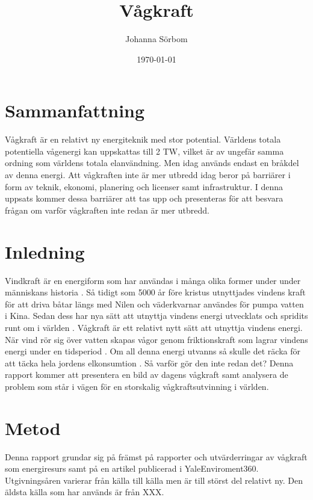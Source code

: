 \documentclass[10pt,a4paper,oneside]{article}
\newcommand{\titlepicture}[2][]{%
  \renewcommand\placetitlepicture{%
    \texttt{[image: \#2]}\par\medskip
  }%
}
\newcommand{\placetitlepicture}{}
\begin{document}
\title{Vågkraft \\ 
\large }
\author{\small Johanna Sörbom}
\date{\small \today}
\titlepicture[width=3in]{Wave}

\maketitle
\newpage

\section{Sammanfattning}
Vågkraft är en relativt ny energiteknik med stor potential. Världens totala potentiella vågenergi kan uppskattas till 2 TW, vilket är av ungefär samma ordning som världens totala elanvändning. Men idag används endast en bråkdel av denna energi. Att vågkraften inte är mer utbredd idag beror på barriärer i form av teknik, ekonomi, planering och licenser samt infrastruktur. I denna uppsats kommer dessa barriärer att tas upp och presenteras för att besvara frågan om varför vågkraften inte redan är mer utbredd.  \newpage

\tableofcontents
\newpage

\section{Inledning}
Vindkraft är en energiform som har användas i många olika former under under människans historia \cite{Elliott}. Så tidigt som 5000 år före kristus utnyttjades vindens kraft för att driva båtar längs med Nilen och väderkvarnar användes för pumpa vatten i Kina. Sedan dess har nya sätt att utnyttja vindens energi utvecklats och spridits runt om i världen \cite{WEF}. Vågkraft är ett relativt nytt sätt att utnyttja vindens energi. När vind rör sig över vatten skapas vågor genom friktionskraft som lagrar vindens energi under en tidsperiod \cite{Elliott}. Om all denna energi utvanns så skulle det räcka för att täcka hela jordens elkonsumtion \cite{Cruz}. Så varför gör den inte redan det? Denna rapport kommer att presentera en bild av dagens vågkraft samt analysera de problem som står i vägen för en storskalig vågkraftsutvinning i världen. 

\section{Metod}
Denna rapport grundar sig på främst på rapporter och utvärderringar av vågkraft som energiresurs samt på en artikel publicerad i YaleEnviroment360. Utgivningsåren varierar från källa till källa men är till störst del relativt ny. Den äldsta källa som har används är från XXX. 
\end{document}

